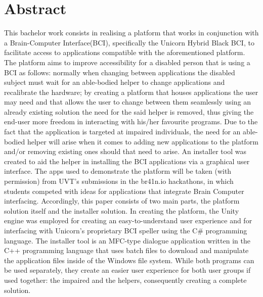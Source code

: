 \chapter*{Abstract}\label{cap:abstract_en}
This bachelor work consists in realising a platform that works in conjunction with a Brain-Computer Interface(BCI), specifically the Unicorn Hybrid Black BCI\cite{Unicorn_Technology}, to facilitate access to applications compatible with the aforementioned platform. The platform aims to improve accessibility for a disabled person that is using a BCI as follows: normally when changing between applications the disabled subject must wait for an able-bodied helper to change applications and recalibrate the hardware; by creating a platform that houses applications the user may need and that allows the user to change between them seamlessly using an already existing solution\cite{Unicorn_Speller} the need for the said helper is removed, thus giving the end-user more freedom in interacting with his/her favourite programs. 
\vspace{\baselineskip}\newline
Due to the fact that the application is targeted at impaired individuals, the need for an able-bodied helper will arise when it comes to adding new applications to the platform and/or removing existing ones should that need to arise. An installer tool was created to aid the helper in installing the BCI applications via a graphical user interface. The apps used to demonstrate the platform will be taken (with permission) from UVT's submissions in the br41n.io hackathons, in which students competed with ideas for applications that integrate Brain Computer interfacing.
\vspace{\baselineskip}\newline
Accordingly, this paper consists of two main parts, the platform solution itself and the installer solution. In creating the platform, the Unity engine was employed for creating an easy-to-understand user experience and for interfacing with Unicorn's proprietary BCI speller\cite{Unicorn_Speller} using the C\# programming language. The installer tool is an MFC-type dialogue application written in the C++ programming language that uses batch files to download and manipulate the application files inside of the Windows file system. While both programs can be used separately, they create an easier user experience for both user groups if used together: the impaired and the helpers, consequently creating a complete solution.
